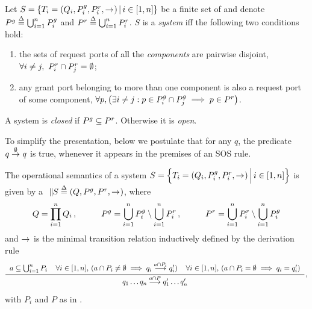 \begin{definition}[System]
  \label{defn:system}
  Let $S = \setdef{T_i = (Q_i, \pin_i, \pout_i, \goesto)}{i \in [1,n]}$ be
  a finite set of \compmodel{} and denote $\pin \bydef{=} \bigcup_{i=1}^n
  \pin_i$ and $\pout \bydef{=} \bigcup_{i=1}^n \pout_i$.  $S$ is a {\em
    system} iff the following two conditions hold:
  \begin{enumerate}
  \item the sets of request ports of all the {\em components} are pairwise
    disjoint, \ie $\forall i \neq j,\ \pout_i \cap \pout_j = \emptyset$;
  \item any grant port belonging to more than one component is also a
    request port of some component, \ie $\forall p, \left(\exists i \neq 
    j: p \in \pin_i \cap \pin_j \implies p \in \pout\right)$.
  \end{enumerate}

  A system is {\em closed} if $\pin \subseteq \pout$.  Otherwise it is {\em
    open}.
\end{definition}

To simplify the presentation, below we postulate that for any $q$, the
predicate $q \goesto[\emptyset] q$ is true, whenever it appears in the
premises of an SOS rule.

\begin{definition}
  \label{defn:composition}
  The operational semantics of a system $S = \Setdef{T_i = (Q_i, \pin_i,
  \pout_i, \goesto)}{i \in [1,n]}$ is given by a \compmodel{} $\compose[S]
  \bydef{=} (Q, \pin, \pout, \goesto)$, where
  \begin{equation}
    \label{eq:composition:ports}
    Q = \prod_{i=1}^n Q_i\,,
    \hspace{1cm}
    \pin = \bigcup_{i=1}^n \pin_i \setminus \bigcup_{i=1}^n \pout_i\,,
    \hspace{1cm}
    \pout = \bigcup_{i=1}^n \pout_i \setminus \bigcup_{i=1}^n \pin_i 
  \end{equation}
  and $\goesto$ is the minimal transition relation inductively defined by
  the derivation rule
  \begin{equation}
    \label{eq:composition:transitions}
    \renewcommand{\arraystretch}{1.5}
    \derrule[3]{
      a \subseteq \bigcup_{i=1}^n P_i &
      \forall i \in [1,n],\, (a \cap P_i \neq \emptyset \implies 
        q_i \longgoesto[a \cap P_i] q_i') &
      \forall i \in [1,n],\, (a \cap P_i = \emptyset \implies q_i = q_i') 
    }{
      q_1 \dots q_n \longgoesto[a \cap P] q_1' \dots q_n'
    }\,,
  \end{equation}
  with $P_i$ and $P$ as in .
\end{definition}

